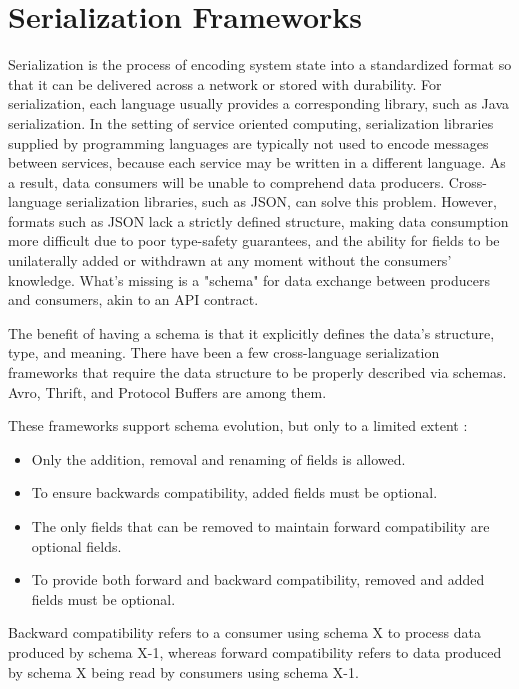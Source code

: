 \section{Serialization Frameworks} %
\label{sec:serialization_frameworks}

Serialization is the process of encoding system state into a standardized format so that it can be delivered across a network or stored with durability.
For serialization, each language usually provides a corresponding library, such as Java serialization.
In the setting of service oriented computing, serialization libraries supplied by programming languages are typically not used to encode messages between services,
because each service may be written in a different language. As a result, data consumers will be unable to comprehend data producers.
Cross-language serialization libraries, such as JSON, can solve this problem.
However, formats such as JSON lack a strictly defined structure,
making data consumption more difficult due to poor type-safety guarantees, and the ability for fields to be unilaterally added or withdrawn at any moment without the consumers' knowledge.
What's missing is a "schema" for data exchange between producers and consumers, akin to an API contract.

The benefit of having a schema is that it explicitly defines the data's structure, type, and meaning.
There have been a few cross-language serialization frameworks that require the data structure to be properly described via schemas.
Avro, Thrift, and Protocol Buffers \cite{8,9,10} are among them.

These frameworks support schema evolution, but only to a limited extent \cite{11}:
\begin{itemize}
    \item Only the addition, removal and renaming of fields is allowed.
    \item To ensure backwards compatibility, added fields must be optional.
    \item The only fields that can be removed to maintain forward compatibility are optional fields.
    \item To provide both forward and backward compatibility, removed and added fields must be optional.
\end{itemize}
Backward compatibility refers to a consumer using schema X to process data produced by schema X-1,
whereas forward compatibility refers to data produced by schema X being read by consumers using schema X-1.

